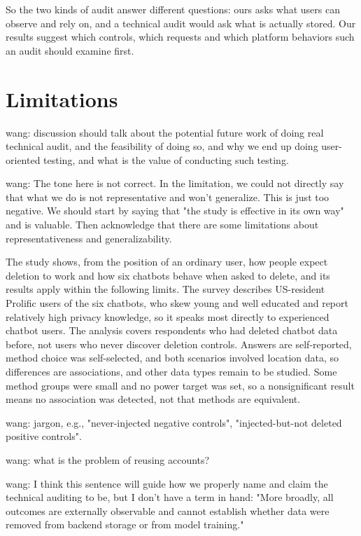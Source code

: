 \documentclass[conference,compsoc]{IEEEtran}
\newcommand{\xw}[1] {{\color{red}wang: #1}}
\begin{document}
So the two kinds of audit answer different questions: ours asks what users can observe and rely on, and a technical audit would ask what is actually stored.
Our results suggest which controls, which requests and which platform behaviors such an audit should examine first.

\section{Limitations}

\xw{discussion should talk about the potential future work of doing real technical audit, and the feasibility of doing so, and why we end up doing user-oriented testing, and what is the value of conducting such testing.}

\xw{The tone here is not correct. In the limitation, we could not directly say that what we do is not representative and won't generalize. This is just too negative. We should start by saying that "the study is effective in its own way" and is valuable. Then acknowledge that there are some limitations about representativeness and generalizability.}

The study shows, from the position of an ordinary user, how people expect deletion to work and how six chatbots behave when asked to delete, and its results apply within the following limits. The survey describes US-resident Prolific users of the six chatbots, who skew young and well educated and report relatively high privacy knowledge, so it speaks most directly to experienced chatbot users. The analysis covers respondents who had deleted chatbot data before, not users who never discover deletion controls. Answers are self-reported, method choice was self-selected, and both scenarios involved location data, so differences are associations, and other data types remain to be studied. Some method groups were small and no power target was set, so a nonsignificant result means no association was detected, not that methods are equivalent.

\xw{jargon, e.g., "never-injected negative controls", "injected-but-not deleted positive controls".}

\xw{what is the problem of reusing accounts?}

\xw{I think this sentence will guide how we properly name and claim the technical auditing to be, but I don't have a term in hand: "More broadly, all outcomes are externally observable and cannot establish whether data were removed from backend storage or from model training."}
\end{document}
